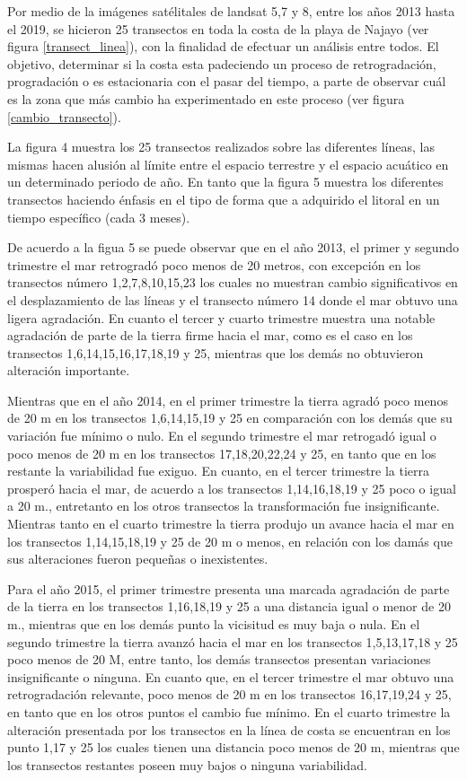 \documentclass[11pt,]{article}
\begin{document}
Por medio de la imágenes satélitales de landsat 5,7 y 8, entre los años
2013 hasta el 2019, se hicieron 25 transectos en toda la costa de la
playa de Najayo (ver figura \ref{transect_linea}), con la finalidad de
efectuar un análisis entre todos. El objetivo, determinar si la costa
esta padeciendo un proceso de retrogradación, progradación o es
estacionaria con el pasar del tiempo, a parte de observar cuál es la
zona que más cambio ha experimentado en este proceso (ver figura
\ref{cambio_transecto}).

La figura 4 muestra los 25 transectos realizados sobre las diferentes
líneas, las mismas hacen alusión al límite entre el espacio terrestre y
el espacio acuático en un determinado periodo de año. En tanto que la
figura 5 muestra los diferentes transectos haciendo énfasis en el tipo
de forma que a adquirido el litoral en un tiempo específico (cada 3
meses).

De acuerdo a la figua 5 se puede observar que en el año 2013, el primer
y segundo trimestre el mar retrogradó poco menos de 20 metros, con
excepción en los transectos número 1,2,7,8,10,15,23 los cuales no
muestran cambio significativos en el desplazamiento de las líneas y el
transecto número 14 donde el mar obtuvo una ligera agradación. En cuanto
el tercer y cuarto trimestre muestra una notable agradación de parte de
la tierra firme hacia el mar, como es el caso en los transectos
1,6,14,15,16,17,18,19 y 25, mientras que los demás no obtuvieron
alteración importante.

Mientras que en el año 2014, en el primer trimestre la tierra agradó
poco menos de 20 m en los transectos 1,6,14,15,19 y 25 en comparación
con los demás que su variación fue mínimo o nulo. En el segundo
trimestre el mar retrogadó igual o poco menos de 20 m en los transectos
17,18,20,22,24 y 25, en tanto que en los restante la variabilidad fue
exiguo. En cuanto, en el tercer trimestre la tierra prosperó hacia el
mar, de acuerdo a los transectos 1,14,16,18,19 y 25 poco o igual a 20
m., entretanto en los otros transectos la transformación fue
insignificante. Mientras tanto en el cuarto trimestre la tierra produjo
un avance hacia el mar en los transectos 1,14,15,18,19 y 25 de 20 m o
menos, en relación con los damás que sus alteraciones fueron pequeñas o
inexistentes.

Para el año 2015, el primer trimestre presenta una marcada agradación de
parte de la tierra en los transectos 1,16,18,19 y 25 a una distancia
igual o menor de 20 m., mientras que en los demás punto la vicisitud es
muy baja o nula. En el segundo trimestre la tierra avanzó hacia el mar
en los transectos 1,5,13,17,18 y 25 poco menos de 20 M, entre tanto, los
demás transectos presentan variaciones insignificante o ninguna. En
cuanto que, en el tercer trimestre el mar obtuvo una retrogradación
relevante, poco menos de 20 m en los transectos 16,17,19,24 y 25, en
tanto que en los otros puntos el cambio fue mínimo. En el cuarto
trimestre la alteración presentada por los transectos en la línea de
costa se encuentran en los punto 1,17 y 25 los cuales tienen una
distancia poco menos de 20 m, mientras que los transectos restantes
poseen muy bajos o ninguna variabilidad.
\end{document}
